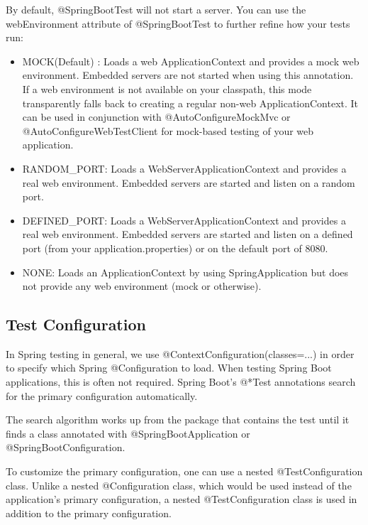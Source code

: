 \documentclass{scrartcl}
\begin{document}
By default, @SpringBootTest will not start a server. You can use the webEnvironment attribute of @SpringBootTest to further refine how your tests run:

\begin{itemize}
    \item MOCK(Default) : Loads a web ApplicationContext and provides a mock web environment. Embedded servers are not started when using this annotation. If a web environment is not available on your classpath, this mode transparently falls back to creating a regular non-web ApplicationContext. It can be used in conjunction with @AutoConfigureMockMvc or @AutoConfigureWebTestClient for mock-based testing of your web application.

    \item RANDOM\_PORT: Loads a WebServerApplicationContext and provides a real web environment. Embedded servers are started and listen on a random port.

    \item DEFINED\_PORT: Loads a WebServerApplicationContext and provides a real web environment. Embedded servers are started and listen on a defined port (from your application.properties) or on the default port of 8080.

    \item NONE: Loads an ApplicationContext by using SpringApplication but does not provide any web environment (mock or otherwise).
\end{itemize}

\subsection{Test Configuration}

In Spring testing in general, we use @ContextConfiguration(classes=...) in order to specify which Spring @Configuration to load.
When testing Spring Boot applications, this is often not required. Spring Boot’s @*Test annotations search for the primary configuration automatically.

The search algorithm works up from the package that contains the test until it finds a class annotated with @SpringBootApplication or @SpringBootConfiguration.

To customize the primary configuration, one can use a nested @TestConfiguration class. Unlike a nested @Configuration class, which would be used instead of the application’s primary configuration, a nested @TestConfiguration class is used in addition to the primary configuration.
\end{document}
